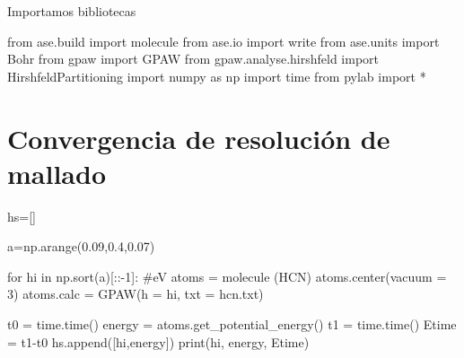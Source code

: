 \documentclass[
  letterpaper,
  DIV=11,
  numbers=noendperiod]{scrreprt}
\newenvironment{Shaded}{\begin{snugshade}}{\end{snugshade}}
\newcommand{\BuiltInTok}[1]{\textcolor[rgb]{0.00,0.23,0.31}{#1}}
\newcommand{\CommentTok}[1]{\textcolor[rgb]{0.37,0.37,0.37}{#1}}
\newcommand{\ControlFlowTok}[1]{\textcolor[rgb]{0.00,0.23,0.31}{#1}}
\newcommand{\DecValTok}[1]{\textcolor[rgb]{0.68,0.00,0.00}{#1}}
\newcommand{\FloatTok}[1]{\textcolor[rgb]{0.68,0.00,0.00}{#1}}
\newcommand{\ImportTok}[1]{\textcolor[rgb]{0.00,0.46,0.62}{#1}}
\newcommand{\KeywordTok}[1]{\textcolor[rgb]{0.00,0.23,0.31}{#1}}
\newcommand{\NormalTok}[1]{\textcolor[rgb]{0.00,0.23,0.31}{#1}}
\newcommand{\OperatorTok}[1]{\textcolor[rgb]{0.37,0.37,0.37}{#1}}
\newcommand{\StringTok}[1]{\textcolor[rgb]{0.13,0.47,0.30}{#1}}
\begin{document}
Importamos bibliotecas

\begin{Shaded}
\begin{Highlighting}[]
\ImportTok{from}\NormalTok{ ase.build }\ImportTok{import}\NormalTok{ molecule}
\ImportTok{from}\NormalTok{ ase.io }\ImportTok{import}\NormalTok{ write}
\ImportTok{from}\NormalTok{ ase.units }\ImportTok{import}\NormalTok{ Bohr}
\ImportTok{from}\NormalTok{ gpaw }\ImportTok{import}\NormalTok{ GPAW}
\ImportTok{from}\NormalTok{ gpaw.analyse.hirshfeld }\ImportTok{import}\NormalTok{ HirshfeldPartitioning}
\ImportTok{import}\NormalTok{ numpy }\ImportTok{as}\NormalTok{ np}
\ImportTok{import}\NormalTok{ time}
\ImportTok{from}\NormalTok{ pylab }\ImportTok{import} \OperatorTok{*}
\end{Highlighting}
\end{Shaded}

\hypertarget{convergencia-de-resoluciuxf3n-de-mallado}{%
\section{Convergencia de resolución de
mallado}\label{convergencia-de-resoluciuxf3n-de-mallado}}

\begin{Shaded}
\begin{Highlighting}[]
\NormalTok{hs}\OperatorTok{=}\NormalTok{[]}

\NormalTok{a}\OperatorTok{=}\NormalTok{np.arange(}\FloatTok{0.09}\NormalTok{,}\FloatTok{0.4}\NormalTok{,}\FloatTok{0.07}\NormalTok{)}

\ControlFlowTok{for}\NormalTok{ hi }\KeywordTok{in}\NormalTok{ np.sort(a)[::}\OperatorTok{{-}}\DecValTok{1}\NormalTok{]: }\CommentTok{\#eV}
\NormalTok{    atoms }\OperatorTok{=}\NormalTok{ molecule (}\StringTok{\textquotesingle{}HCN\textquotesingle{}}\NormalTok{)}
\NormalTok{    atoms.center(vacuum }\OperatorTok{=} \DecValTok{3}\NormalTok{)}
\NormalTok{    atoms.calc }\OperatorTok{=}\NormalTok{ GPAW(h }\OperatorTok{=}\NormalTok{ hi, txt }\OperatorTok{=} \StringTok{\textquotesingle{}hcn.txt\textquotesingle{}}\NormalTok{)}

\NormalTok{    t0 }\OperatorTok{=}\NormalTok{ time.time()}
\NormalTok{    energy }\OperatorTok{=}\NormalTok{ atoms.get\_potential\_energy()}
\NormalTok{    t1 }\OperatorTok{=}\NormalTok{ time.time()}
\NormalTok{    Etime }\OperatorTok{=}\NormalTok{ t1}\OperatorTok{{-}}\NormalTok{t0}
\NormalTok{    hs.append([hi,energy])}
    \BuiltInTok{print}\NormalTok{(hi, energy, Etime)}
\end{Highlighting}
\end{Shaded}
\end{document}
